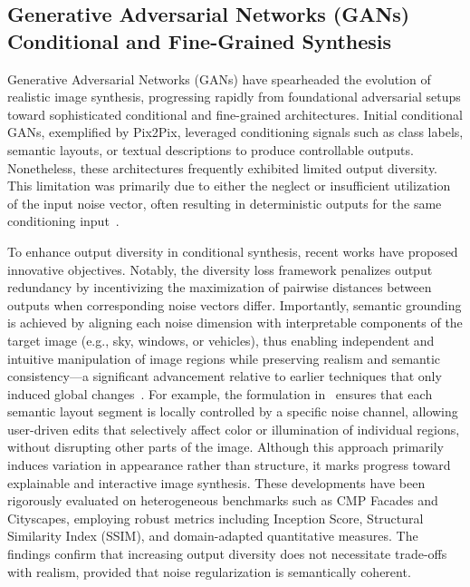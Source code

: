 \documentclass[sigconf]{acmart}
\begin{document}
\subsection{Generative Adversarial Networks (GANs) Conditional and Fine-Grained Synthesis}

Generative Adversarial Networks (GANs) have spearheaded the evolution of realistic image synthesis, progressing rapidly from foundational adversarial setups toward sophisticated conditional and fine-grained architectures. Initial conditional GANs, exemplified by Pix2Pix, leveraged conditioning signals such as class labels, semantic layouts, or textual descriptions to produce controllable outputs. Nonetheless, these architectures frequently exhibited limited output diversity. This limitation was primarily due to either the neglect or insufficient utilization of the input noise vector, often resulting in deterministic outputs for the same conditioning input~\cite{ref93,ref95}.

To enhance output diversity in conditional synthesis, recent works have proposed innovative objectives. Notably, the diversity loss framework penalizes output redundancy by incentivizing the maximization of pairwise distances between outputs when corresponding noise vectors differ. Importantly, semantic grounding is achieved by aligning each noise dimension with interpretable components of the target image (e.g., sky, windows, or vehicles), thus enabling independent and intuitive manipulation of image regions while preserving realism and semantic consistency---a significant advancement relative to earlier techniques that only induced global changes~\cite{ref93}. For example, the formulation in~\cite{ref93} ensures that each semantic layout segment is locally controlled by a specific noise channel, allowing user-driven edits that selectively affect color or illumination of individual regions, without disrupting other parts of the image. Although this approach primarily induces variation in appearance rather than structure, it marks progress toward explainable and interactive image synthesis. These developments have been rigorously evaluated on heterogeneous benchmarks such as CMP Facades and Cityscapes, employing robust metrics including Inception Score, Structural Similarity Index (SSIM), and domain-adapted quantitative measures. The findings confirm that increasing output diversity does not necessitate trade-offs with realism, provided that noise regularization is semantically coherent.
\end{document}
